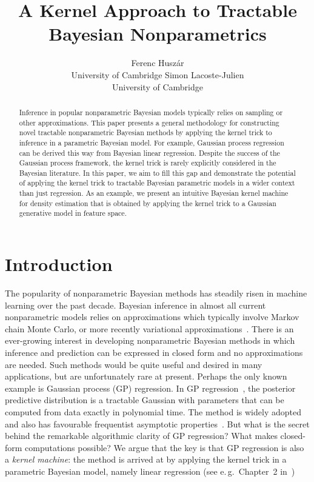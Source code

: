 \documentclass[twoside]{article}
\title{A Kernel Approach to Tractable Bayesian Nonparametrics}
\author{Ferenc Husz\'{a}r\\University of Cambridge \And Simon Lacoste-Julien\\University of Cambridge}
\newcommand{\eg}{e.\,g.\ }
\begin{document}
\maketitle

\begin{abstract}
Inference in popular nonparametric Bayesian models typically relies on sampling or other approximations. This paper presents a general methodology for constructing novel tractable nonparametric Bayesian methods by applying the kernel trick to inference in a parametric Bayesian model. For example, Gaussian process regression can be derived this way from Bayesian linear regression. Despite the success of the Gaussian process framework, the kernel trick is rarely explicitly considered in the Bayesian literature. In this paper, we aim to fill this gap and demonstrate the potential of applying the kernel trick to tractable Bayesian parametric models in a wider context than just regression. As an example, we present an intuitive Bayesian kernel machine for density estimation that is obtained by applying the kernel trick to a Gaussian generative model in feature space.
\end{abstract}

\section{Introduction}

The popularity of nonparametric Bayesian methods has steadily risen in machine learning over the past decade. Bayesian inference in almost all current nonparametric models relies on approximations which typically involve Markov chain Monte Carlo, or more recently variational approximations~\cite{Blei2004}. There is an ever-growing interest in developing nonparametric Bayesian methods in which inference and prediction can be expressed in closed form and no approximations are needed. Such methods would be quite useful and desired in many applications, but are unfortunately rare at present. Perhaps the only known example is Gaussian process (GP) regression. In GP regression~\cite{Rasmussen2006}, the posterior predictive distribution is a tractable Gaussian with parameters that can be computed from data exactly in polynomial time. The method is widely adopted and also has favourable frequentist asymptotic properties~\cite{vanderVaart2008}. But what is the secret behind the remarkable algorithmic clarity of GP regression? What makes closed-form computations possible? We argue that the key is that GP regression is also a \emph{kernel machine}: the method is arrived at by applying the kernel trick in a parametric Bayesian model, namely linear regression (see \eg Chapter~2 in~\cite{Rasmussen2006})
\end{document}
